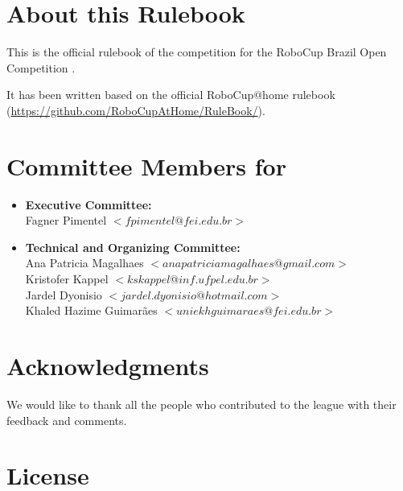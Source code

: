 

\section*{About this Rulebook}  
This is the official rulebook of the \AtHome{} competition for the RoboCup Brazil Open Competition \YEAR.

It has been written based on the official RoboCup@home rulebook (\url{https://github.com/RoboCupAtHome/RuleBook/}). 

\section*{Committee Members for \YEAR}
\begin{itemize}
    \item \textbf{Executive Committee:} \\ Fagner Pimentel $<fpimentel@fei.edu.br>$
    \item \textbf{Technical and Organizing Committee:} \\ 
    Ana Patricia Magalhaes $<anapatriciamagalhaes@gmail.com>$ \\
    Kristofer Kappel $<kskappel@inf.ufpel.edu.br>$ \\
    Jardel Dyonisio  $<jardel.dyonisio@hotmail.com>$ \\
    Khaled Hazime Guimarães $<uniekhguimaraes@fei.edu.br>$
\end{itemize}

\section*{Acknowledgments}
\label{sec:acknowledgments}

We would like to thank all the people who contributed to the \AtHome{} league with their feedback and comments.

\vfill

\section*{License}

\doclicenseThis

